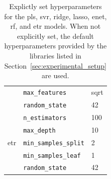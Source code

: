 \begin{table}
\begin{tabular}{@{}llp{}@{}}
& \texttt{max\_features} & sqrt \\
& \texttt{random\_state} & 42 \\
\midrule
\multirow{5}{*}{\gls{etr}}
& \texttt{n\_estimators} & 100 \\
& \texttt{max\_depth} & 10 \\
& \texttt{min\_samples\_split} & 2 \\
& \texttt{min\_samples\_leaf} & 1 \\
& \texttt{random\_state} & 42 \\
\midrule
\end{tabular}
\caption{Explictly set hyperparameters for the \gls{pls}, \gls{svr}, ridge, \gls{lasso}, \gls{enet}, \gls{rf}, and \gls{etr} models. When not explicitly set, the default hyperparameters provided by the libraries listed in Section~\ref{sec:experimental_setup} are used.}
\label{tab:combined_hyperparameters}
\end{table}

\FloatBarrier

